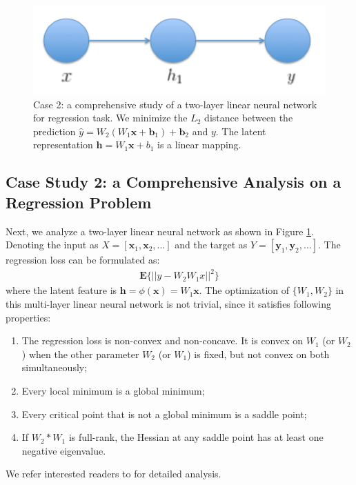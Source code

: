 \begin{figure}
	\begin{center}
		\includegraphics[width=0.35\columnwidth]{regression.png}
	\end{center}
	\caption{Case 2: a comprehensive study of a two-layer linear neural network for regression task. We minimize the $L_2$ distance between the prediction $\hat{y}=W_2(W_1\mathbf{x}+\mathbf{b}_1)+\mathbf{b}_2$ and $y$. The latent representation $\mathbf{h}=W_1\mathbf{x}+b_1$ is a linear mapping.}
	\label{fig-regression}
\end{figure}
\subsection{Case Study 2: a Comprehensive Analysis on a Regression Problem}
Next, we analyze a two-layer linear neural network as shown in Figure \ref{fig-regression}. Denoting the input as $X=[\mathbf{x}_1,\mathbf{x}_2,...]$ and the target as $Y=[\mathbf{y}_1,\mathbf{y}_2,...]$. The regression loss can be formulated as:
\begin{eqnarray*}
\mathbf{E}\{||y-W_2W_1x||^2\} 
\end{eqnarray*}
where the latent feature is $\mathbf{h}=\phi(\mathbf{x})=W_1\mathbf{x}$. The optimization of $\{W_1,W_2\}$ in this multi-layer linear neural network is not trivial, since it satisfies following properties:
\begin{enumerate}
\item The regression loss is non-convex and non-concave. It is convex on $W_1$ (or $W_2$) when the other parameter $W_2$ (or $W_1$) is fixed, but not convex on both simultaneously;
\item Every local minimum is a global minimum;
\item Every critical point that is not a global minimum is a saddle point;
\item If $W_2*W_1$ is full-rank, the Hessian at any saddle point has at least one negative eigenvalue.
\end{enumerate}
We refer interested readers to \cite{nn-global-minima,deep-global-minima} for detailed analysis. 

